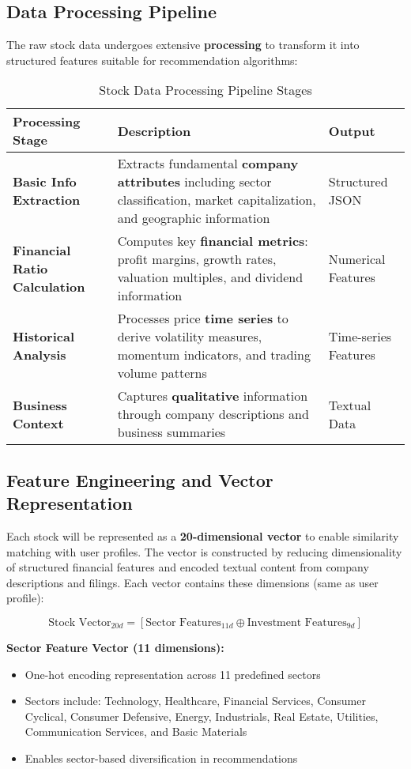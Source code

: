 \subsection{Data Processing Pipeline}
The raw stock data undergoes extensive \textbf{processing} to transform it into structured features suitable for recommendation algorithms:

\begin{table}[h]
\centering
\caption{Stock Data Processing Pipeline Stages}
\begin{tabular}{|p{3cm}|p{8cm}|p{2cm}|}
\hline
\textbf{Processing Stage} & \textbf{Description} & \textbf{Output} \\
\hline
\textbf{Basic Info Extraction} & Extracts fundamental \textbf{company attributes} including sector classification, market capitalization, and geographic information & Structured JSON \\
\hline
\textbf{Financial Ratio Calculation} & Computes key \textbf{financial metrics}: profit margins, growth rates, valuation multiples, and dividend information & Numerical Features \\
\hline
\textbf{Historical Analysis} & Processes price \textbf{time series} to derive volatility measures, momentum indicators, and trading volume patterns & Time-series Features \\
\hline
\textbf{Business Context} & Captures \textbf{qualitative} information through company descriptions and business summaries & Textual Data \\
\hline
\end{tabular}
\end{table}

\subsection{Feature Engineering and Vector Representation}
Each stock will be represented as a \textbf{20-dimensional vector} to enable similarity matching with user profiles. The vector is constructed by reducing dimensionality of structured financial features and encoded textual content from company descriptions and filings. Each vector contains these dimensions (same as user profile):

\begin{equation}
\text{Stock Vector}_{20d} = [\text{Sector Features}_{11d} \oplus \text{Investment Features}_{9d}]
\end{equation}

\textbf{Sector Feature Vector (11 dimensions):}
\begin{itemize}
    \item One-hot encoding representation across 11 predefined sectors
    \item Sectors include: Technology, Healthcare, Financial Services, Consumer Cyclical, Consumer Defensive, Energy, Industrials, Real Estate, Utilities, Communication Services, and Basic Materials
    \item Enables sector-based diversification in recommendations
\end{itemize}

